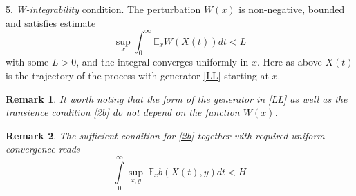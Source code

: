 \documentclass[a4paper,12pt]{article}
\newtheorem{remark}{Remark}[section]
\newcommand{\XXX}{{\mathfrak{X}}}
\begin{document}
5. {\it W-integrability} condition. The perturbation $W(x)$ is non-negative, bounded and satisfies estimate
\begin{equation}\label{5a}
\sup\limits_{x}  \int_{0}^{\infty} \mathbb{E}_{x} W(X(t)) dt < L
\end{equation}
with some $L>0$, and the integral converges uniformly in $x$. Here as above $X(t)$ is the trajectory of the process with generator \eqref{LL} starting at $x$.
\medskip




\begin{remark}\label{R1}
It worth noting that the form of the generator in \eqref{LL}  as well as the transience condition \eqref{2b} do not depend on the function $W(x)$.
\end{remark}


\begin{remark}\label{R2}
The sufficient condition for \eqref{2b} together with required uniform convergence reads
\begin{equation}\label{suf-cond}
\int\limits_0^{\infty}  \sup\limits_{x, y} \ \mathbb{E}_x b(X(t), y) dt < H
\end{equation}
\end{remark}
\end{document}
